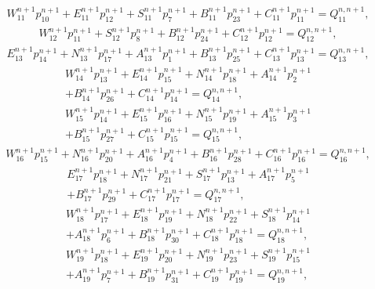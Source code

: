 %
\begin{multline}
	W^{n+1}_{11}p^{n+1}_{10}+E^{n+1}_{11}p^{n+1}_{12}+S^{n+1}_{11}p^{n+1}_{7}+B^{n+1}_{11}p^{n+1}_{23}+C^{n+1}_{11}p^{n+1}_{11}=Q^{n, n+1}_{11},
\end{multline}
%
\begin{multline}
	W^{n+1}_{12}p^{n+1}_{11}+S^{n+1}_{12}p^{n+1}_{8}+B^{n+1}_{12}p^{n+1}_{24}+C^{n+1}_{12}p^{n+1}_{12}=Q^{n, n+1}_{12},
\end{multline}
%
\begin{multline}
	E^{n+1}_{13}p^{n+1}_{14}+N^{n+1}_{13}p^{n+1}_{17}+A^{n+1}_{13}p^{n+1}_{1}+B^{n+1}_{13}p^{n+1}_{25}+C^{n+1}_{13}p^{n+1}_{13}=Q^{n, n+1}_{13},
\end{multline}
%
\begin{multline}
	W^{n+1}_{14}p^{n+1}_{13}+E^{n+1}_{14}p^{n+1}_{15}+N^{n+1}_{14}p^{n+1}_{18}+A^{n+1}_{14}p^{n+1}_{2}\\+B^{n+1}_{14}p^{n+1}_{26}+C^{n+1}_{14}p^{n+1}_{14}=Q^{n, n+1}_{14},
\end{multline}
%
\begin{multline}
	W^{n+1}_{15}p^{n+1}_{14}+E^{n+1}_{15}p^{n+1}_{16}+N^{n+1}_{15}p^{n+1}_{19}+A^{n+1}_{15}p^{n+1}_{3}\\+B^{n+1}_{15}p^{n+1}_{27}+C^{n+1}_{15}p^{n+1}_{15}=Q^{n, n+1}_{15},
\end{multline}
%
\begin{multline}
	W^{n+1}_{16}p^{n+1}_{15}+N^{n+1}_{16}p^{n+1}_{20}+A^{n+1}_{16}p^{n+1}_{4}+B^{n+1}_{16}p^{n+1}_{28}+C^{n+1}_{16}p^{n+1}_{16}=Q^{n, n+1}_{16},
\end{multline}
%
\begin{multline}
	E^{n+1}_{17}p^{n+1}_{18}+N^{n+1}_{17}p^{n+1}_{21}+S^{n+1}_{17}p^{n+1}_{13}+A^{n+1}_{17}p^{n+1}_{5}\\+B^{n+1}_{17}p^{n+1}_{29}+C^{n+1}_{17}p^{n+1}_{17}=Q^{n, n+1}_{17},
\end{multline}
%
\begin{multline}
	W^{n+1}_{18}p^{n+1}_{17}+E^{n+1}_{18}p^{n+1}_{19}+N^{n+1}_{18}p^{n+1}_{22}+S^{n+1}_{18}p^{n+1}_{14}\\+A^{n+1}_{18}p^{n+1}_{6}+B^{n+1}_{18}p^{n+1}_{30}+C^{n+1}_{18}p^{n+1}_{18}=Q^{n, n+1}_{18},
\end{multline}
%
\begin{multline}
	W^{n+1}_{19}p^{n+1}_{18}+E^{n+1}_{19}p^{n+1}_{20}+N^{n+1}_{19}p^{n+1}_{23}+S^{n+1}_{19}p^{n+1}_{15}\\+A^{n+1}_{19}p^{n+1}_{7}+B^{n+1}_{19}p^{n+1}_{31}+C^{n+1}_{19}p^{n+1}_{19}=Q^{n, n+1}_{19},
\end{multline}
